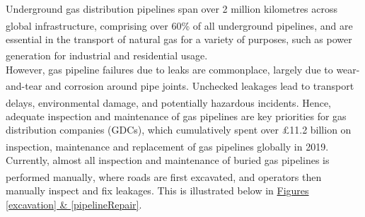 \documentclass[11pt]{article}		%
\newcommand{\supercite}[1]{\textsuperscript{\cite{#1}}}		%
\begin{document}
		Underground gas distribution pipelines span over 2 million kilometres across global infrastructure, comprising over 60\% of all underground pipelines\supercite{sönnichsen_5_2021}, and are essential in the transport of natural gas for a variety of purposes, such as power generation for industrial and residential usage\supercite{group.met.com}. 
		\\
		\hspace*{2ex}However, gas pipeline failures due to leaks are commonplace, largely due to wear-and-tear and corrosion around pipe joints\supercite{corrosion1}. Unchecked leakages lead to transport delays, environmental damage, and potentially hazardous incidents\supercite{hazardousincidents}. Hence, adequate inspection and maintenance of gas pipelines are key priorities for gas distribution companies (GDCs), which cumulatively spent over £11.2 billion on inspection, maintenance  and replacement of gas pipelines globally in 2019\supercite{ltd}. 
		\\
		\hspace*{2ex}Currently, almost all inspection and maintenance of buried gas pipelines is performed manually\supercite{manually}, where roads are first excavated, and operators then manually inspect and fix leakages. This is illustrated below in \hyperref[excavation]{Figures \ref*{excavation} \& \ref*{pipelineRepair}}.
\end{document}
